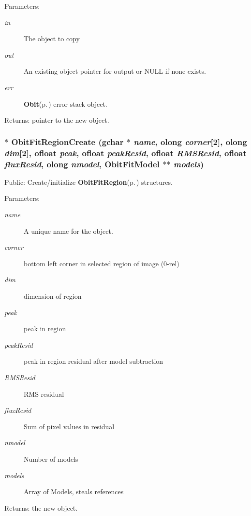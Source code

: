 \begin{Desc}
\item[Parameters:]
\begin{description}
\item[{\em in}]The object to copy \item[{\em out}]An existing object pointer for output or NULL if none exists. \item[{\em err}]{\bf Obit}{\rm (p.\,\pageref{structObit})} error stack object. \end{description}
\end{Desc}
\begin{Desc}
\item[Returns:]pointer to the new object. \end{Desc}
\subsubsection{$\ast$ Obit\-Fit\-Region\-Create (gchar $\ast$ {\em name}, {\bf olong} {\em corner}[2], {\bf olong} {\em dim}[2], {\bf ofloat} {\em peak}, {\bf ofloat} {\em peak\-Resid}, {\bf ofloat} {\em RMSResid}, {\bf ofloat} {\em flux\-Resid}, {\bf olong} {\em nmodel}, {\bf Obit\-Fit\-Model} $\ast$$\ast$ {\em models})}\label{ObitFitRegion_8c_a11}


Public: Create/initialize {\bf Obit\-Fit\-Region}{\rm (p.\,\pageref{structObitFitRegion})} structures. 

\begin{Desc}
\item[Parameters:]
\begin{description}
\item[{\em name}]A unique name for the object. \item[{\em corner}]bottom left corner in selected region of image (0-rel) \item[{\em dim}]dimension of region \item[{\em peak}]peak in region \item[{\em peak\-Resid}]peak in region residual after model subtraction \item[{\em RMSResid}]RMS residual \item[{\em flux\-Resid}]Sum of pixel values in residual \item[{\em nmodel}]Number of models \item[{\em models}]Array of Models, steals references \end{description}
\end{Desc}
\begin{Desc}
\item[Returns:]the new object. \end{Desc}
